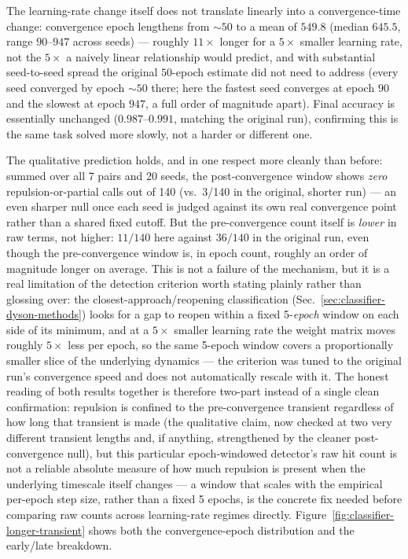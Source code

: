 \documentclass[11pt]{article}
\begin{document}
The learning-rate change itself does not translate linearly into a
convergence-time change: convergence epoch lengthens from
$\sim\!50$ to a mean of $549.8$ (median $645.5$, range $90$--$947$
across seeds) --- roughly $11\times$ longer for a $5\times$ smaller
learning rate, not the $5\times$ a naively linear relationship would
predict, and with substantial seed-to-seed spread the original
$50$-epoch estimate did not need to address (every seed converged by
epoch $\sim\!50$ there; here the fastest seed converges at epoch $90$
and the slowest at epoch $947$, a full order of magnitude apart). Final
accuracy is essentially unchanged ($0.987$--$0.991$, matching the
original run), confirming this is the same task solved more slowly, not
a harder or different one.

The qualitative prediction holds, and in one respect more cleanly than
before: summed over all 7 pairs and 20 seeds, the post-convergence
window shows \emph{zero} repulsion-or-partial calls out of 140
(vs.\ 3/140 in the original, shorter run) --- an even sharper null once
each seed is judged against its own real convergence point rather than
a shared fixed cutoff. But the pre-convergence count itself is
\emph{lower} in raw terms, not higher: $11/140$ here against $36/140$
in the original run, even though the pre-convergence window is, in
epoch count, roughly an order of magnitude longer on average. This is
not a failure of the mechanism, but it is a real limitation of the
detection criterion worth stating plainly rather than glossing over:
the closest-approach/reopening classification (Sec.~\ref{sec:classifier-dyson-methods})
looks for a gap to reopen within a fixed 5-\emph{epoch} window on each
side of its minimum, and at a $5\times$ smaller learning rate the
weight matrix moves roughly $5\times$ less per epoch, so the same
5-epoch window covers a proportionally smaller slice of the underlying
dynamics --- the criterion was tuned to the original run's convergence
speed and does not automatically rescale with it. The honest reading of
both results together is therefore two-part instead of a single clean
confirmation: repulsion is confined to the pre-convergence transient
regardless of how long that transient is made (the qualitative claim,
now checked at two very different transient lengths and, if anything,
strengthened by the cleaner post-convergence null), but this
particular epoch-windowed detector's raw hit count is not a reliable
absolute measure of how much repulsion is present when the underlying
timescale itself changes --- a window that scales with the empirical
per-epoch step size, rather than a fixed 5 epochs, is the concrete fix
needed before comparing raw counts across learning-rate regimes
directly. Figure~\ref{fig:classifier-longer-transient}
shows both the convergence-epoch distribution and the early/late
breakdown.
\end{document}
